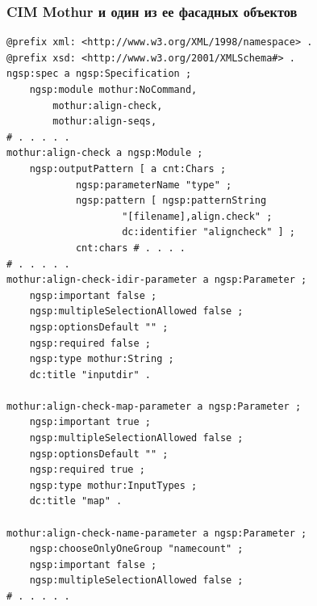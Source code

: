 \documentclass[10pt]{beamer}
\begin{document}
\begin{frame}[fragile]
  \frametitle{CIM Mothur и один из ее фасадных объектов}
\begin{multicols}{2}
\begin{verbatim}
@prefix xml: <http://www.w3.org/XML/1998/namespace> .
@prefix xsd: <http://www.w3.org/2001/XMLSchema#> .
ngsp:spec a ngsp:Specification ;
    ngsp:module mothur:NoCommand,
        mothur:align-check,
        mothur:align-seqs,
# . . . . .
mothur:align-check a ngsp:Module ;
    ngsp:outputPattern [ a cnt:Chars ;
            ngsp:parameterName "type" ;
            ngsp:pattern [ ngsp:patternString
                    "[filename],align.check" ;
                    dc:identifier "aligncheck" ] ;
            cnt:chars # . . . .
# . . . . .
mothur:align-check-idir-parameter a ngsp:Parameter ;
    ngsp:important false ;
    ngsp:multipleSelectionAllowed false ;
    ngsp:optionsDefault "" ;
    ngsp:required false ;
    ngsp:type mothur:String ;
    dc:title "inputdir" .

mothur:align-check-map-parameter a ngsp:Parameter ;
    ngsp:important true ;
    ngsp:multipleSelectionAllowed false ;
    ngsp:optionsDefault "" ;
    ngsp:required true ;
    ngsp:type mothur:InputTypes ;
    dc:title "map" .

mothur:align-check-name-parameter a ngsp:Parameter ;
    ngsp:chooseOnlyOneGroup "namecount" ;
    ngsp:important false ;
    ngsp:multipleSelectionAllowed false ;
# . . . . .
\end{verbatim}


\end{multicols}
\end{frame}
\end{document}
